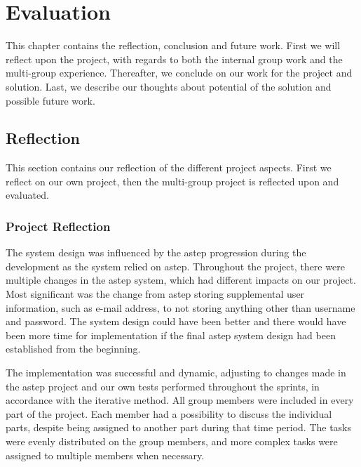 \chapter{Evaluation}
This chapter contains the reflection, conclusion and future work.
First we will reflect upon the project, with regards to both the internal group work and the multi-group experience.
Thereafter, we conclude on our work for the project and solution.
Last, we describe our thoughts about potential of the solution and possible future work.

\section{Reflection}
This section contains our reflection of the different project aspects.
First we reflect on our own project, then the multi-group project is reflected upon and evaluated.

\subsection{Project Reflection}
The system design was influenced by the \gls{astep} progression during the development as the system relied on \gls{astep}.
Throughout the project, there were multiple changes in the \gls{astep} system, which had different impacts on our project.
Most significant was the change from \gls{astep} storing supplemental user information, such as e-mail address, to not storing anything other than username and password.
The system design could have been better and there would have been more time for implementation if the final \gls{astep} system design had been established from the beginning.

The implementation was successful and dynamic, adjusting to changes made in the \gls{astep} project and our own tests performed throughout the sprints, in accordance with the iterative method.
All group members were included in every part of the project.
Each member had a possibility to discuss the individual parts, despite being assigned to another part during that time period.
The tasks were evenly distributed on the group members, and more complex tasks were assigned to multiple members when necessary.


